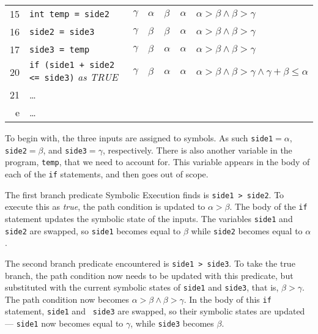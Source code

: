 \begin{center}
{\begin{tabular}{rllllll}
15          & {\tt int temp = side2}                           & $\gamma$    & $\alpha$    & $\beta$     & $\alpha$   & $\alpha > \beta \wedge \beta > \gamma$ \\
16          & {\tt side2 = side3}                              & $\gamma$    & $\beta$     & $\beta$     & $\alpha$   & $\alpha > \beta \wedge \beta > \gamma$ \\
17          & {\tt side3 = temp}                               & $\gamma$    & $\beta$     & $\alpha$    & $\alpha$   & $\alpha > \beta \wedge \beta > \gamma$ \\
20          & {\tt if (side1 + side2 <= side3)} {\it as TRUE}  & $\gamma$    & $\beta$     & $\alpha$    & $\alpha$   & $\alpha > \beta \wedge \beta > \gamma \wedge \gamma + \beta \leq \alpha$ \\
21          & \dots \\
e           & \dots \\
\bottomrule
\end{tabular}}
\end{center}


To begin with, the three inputs are assigned to symbols. As such {\tt side1}$ =
\alpha$, {\tt side2}$ = \beta$, and {\tt side3}$ = \gamma$, respectively. There
is also another variable in the program, {\tt temp}, that we need to account
for. This variable appears in the body of each of the {\tt if} statements, and
then goes out of scope. 


The first branch predicate Symbolic Execution finds is {\tt side1 > side2}. To
execute this as {\it true}, the path condition is updated to $\alpha > \beta$.
The body of the {\tt if} statement updates the symbolic state of the inputs. The
variables {\tt side1} and {\tt side2} are swapped, so {\tt side1} becomes equal
to $\beta$ while {\tt side2} becomes equal to $\alpha$. 


The second branch predicate encountered is {\tt side1 > side3}. To take the true
branch, the path condition now needs to be updated with this predicate, but
substituted with the current symbolic states of {\tt side1} and {\tt side3},
that is, $\beta > \gamma$. The path condition now becomes $\alpha > \beta \wedge
\beta > \gamma$. In the body of this {\tt if} statement, {\tt side1} and {\tt
side3} are swapped, so their symbolic states are updated --- {\tt side1} now
becomes equal to $\gamma$, while {\tt side3} becomes $\beta$.

